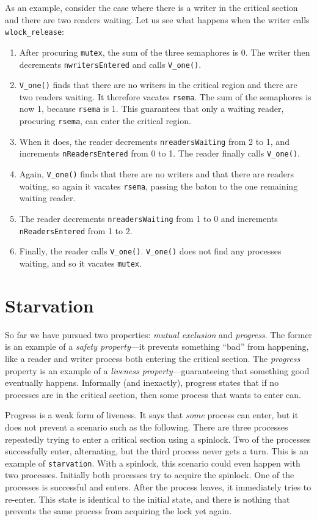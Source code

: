 \documentclass{report}
\begin{document}
As an example, consider the case where there is a writer in the critical
section and there are two readers waiting.  Let us see what happens when
the writer calls \texttt{wlock\_release}:
\begin{enumerate}
\item After procuring \texttt{mutex},
the sum of the three semaphores is 0.  The writer then decrements
\texttt{nwritersEntered} and calls \texttt{V\_one()}.
\item \texttt{V\_one()} finds that there are no writers in the critical region
and there are two readers waiting.  It therefore vacates \texttt{rsema}.
The sum of the semaphores is now 1, because \texttt{rsema} is 1.  This
guarantees that only a waiting reader, procuring \texttt{rsema}, can enter
the critical region.
\item When it does, the reader decrements \texttt{nreadersWaiting}
from 2 to 1, and increments \texttt{nReadersEntered} from 0 to 1.
The reader finally calls \texttt{V\_one()}.
\item Again, \texttt{V\_one()} finds that there are no writers and
that there are readers waiting, so again it vacates \texttt{rsema},
passing the baton to the one remaining waiting reader.
\item The reader decrements \texttt{nreadersWaiting} from 1 to 0 and
increments \texttt{nReadersEntered} from 1 to 2.
\item Finally, the reader  calls \texttt{V\_one()}.
\texttt{V\_one()} does not find any processes waiting,
and so it vacates \texttt{mutex}.
\end{enumerate}

\chapter{Starvation}

So far we have pursued two properties: \emph{mutual exclusion}
and \emph{progress}.  The former is an example of a
\emph{safety property}---it prevents something ``bad'' from
happening, like a reader and writer process both entering the
critical section.  The \emph{progress} property is an example
of a \emph{liveness property}---guaranteeing that something good
eventually happens.
Informally (and inexactly), progress states that if no processes
are in the critical section, then some process that wants to enter
can.

Progress is a weak form of liveness.  It says that \emph{some}
process can enter, but it does not prevent a scenario such as
the following.  There are three processes repeatedly trying to
enter a critical section using a spinlock.  Two of
the processes successfully enter, alternating, but the third
process never gets a turn.  This is an example of
\texttt{starvation}.  With a spinlock, this scenario could
even happen with two processes.  Initially both processes
try to acquire the spinlock.  One of the processes is
successful and enters.  After the process leaves, it immediately
tries to re-enter.  This state is identical to the initial
state, and there is nothing that prevents the same process
from acquiring the lock yet again.
\end{document}

